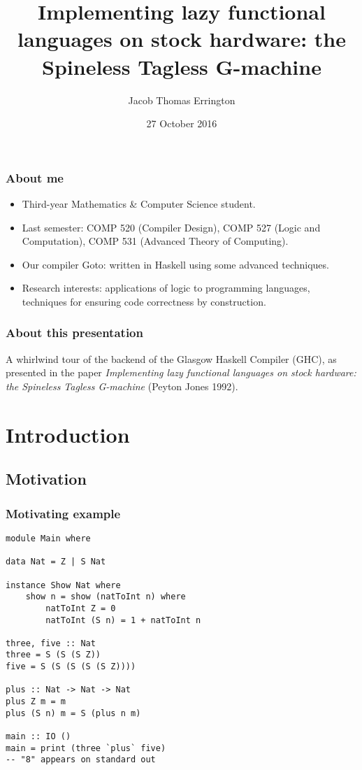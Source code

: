 \documentclass{beamer}
\author{Jacob Thomas Errington}
\title{
    Implementing lazy functional languages on stock hardware:
    the Spineless Tagless G-machine
}
\institute{McGill University}
\date{27 October 2016}
\begin{document}
\frame{\titlepage}

\begin{frame}
    \frametitle{About me}

    \begin{itemize}
        \item Third-year Mathematics \& Computer Science student.
        \item Last semester:
            COMP 520 (Compiler Design),
            COMP 527 (Logic and Computation),
            COMP 531 (Advanced Theory of Computing).
        \item Our compiler Goto: written in Haskell using some advanced
            techniques.
        \item Research interests: applications of logic to programming
            languages, techniques for ensuring code correctness by
            construction.
    \end{itemize}
\end{frame}

\begin{frame}
    \frametitle{About this presentation}

    A whirlwind tour of the backend of the Glasgow Haskell Compiler (GHC), as
    presented in the paper \emph{Implementing lazy functional languages on
    stock hardware: the Spineless Tagless G-machine} (Peyton Jones 1992).

    \tableofcontents
\end{frame}

\section{Introduction}

\subsection{Motivation}

\begin{frame}
    \frametitle{Motivating example}

    \begin{lstlisting}
module Main where

data Nat = Z | S Nat

instance Show Nat where
    show n = show (natToInt n) where
        natToInt Z = 0
        natToInt (S n) = 1 + natToInt n

three, five :: Nat
three = S (S (S Z))
five = S (S (S (S (S Z))))

plus :: Nat -> Nat -> Nat
plus Z m = m
plus (S n) m = S (plus n m)

main :: IO ()
main = print (three `plus` five)
-- "8" appears on standard out
    \end{lstlisting}
\end{frame}
\end{document}
